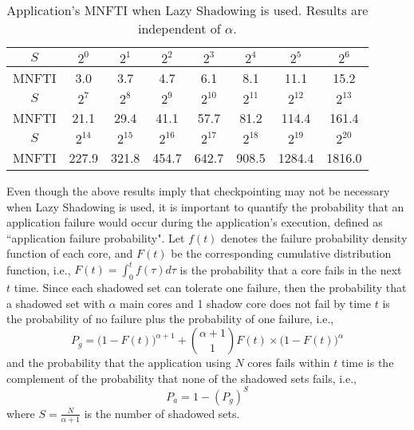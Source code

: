 \begin{table}[b!]
	\caption{Application's MNFTI when Lazy Shadowing is used. Results are independent of $\alpha$. }
	\centering
	\small
	\begin{tabular}{|c|c|c|c|c|c|c|c|}
		\hline
		$S$ & $2^{0}$ & $2^{1}$ & $2^{2}$ & $2^{3}$ & $2^{4}$ & $2^{5}$ & $2^{6}$ \\
		\hline
		MNFTI & 3.0 & 3.7 & 4.7 & 6.1 & 8.1 & 11.1 & 15.2\\
		\hline\hline
		$S$ & $2^{7}$ & $2^{8}$ & $2^{9}$ & $2^{10}$ & $2^{11}$ & $2^{12}$ & $2^{13}$ \\
		\hline
		MNFTI & 21.1 & 29.4 & 41.1 & 57.7 & 81.2 & 114.4 & 161.4 \\
		\hline\hline
		$S$ & $2^{14}$ & $2^{15}$ & $2^{16}$ & $2^{17}$ & $2^{18}$ & $2^{19}$ & $2^{20}$ \\
		\hline
		MNFTI & 227.9 & 321.8 & 454.7 & 642.7 & 908.5 & 1284.4 & 1816.0 \\
		\hline
	\end{tabular}
	\label{tbl:mnfti}
\end{table}


Even though the above results imply that checkpointing may not be necessary when Lazy Shadowing is used, it is important to quantify the probability that an application failure would occur during the application's execution, defined as ``application failure probability". Let $f(t)$ denotes the failure probability density function of each core, and $F(t)$ be the corresponding cumulative distribution function, i.e., $F(t) = \int_0^tf(\tau)d\tau$ is the probability that a core fails in the next $t$ time. 
Since each shadowed set can tolerate one failure, 
then the probability that a shadowed set with $\alpha$ main cores and 1 shadow core does not fail by time $t$ is the probability of no failure plus the probability of one failure, i.e., 
\begin{equation}
	P_g = \Big(1-F(t)\Big)^{\alpha+1} + {{\alpha+1} \choose 1}F(t)\times \Big(1-F(t)\Big)^{\alpha}
\end{equation}
and the probability that the application using $N$ cores fails within $t$ time is the complement of the probability that
none of the shadowed sets fails, i.e.,
\begin{equation}
	P_a = 1 - ({P_g})^{S}
\end{equation}
where $S=\frac{N}{\alpha+1}$ is the number of shadowed sets.

